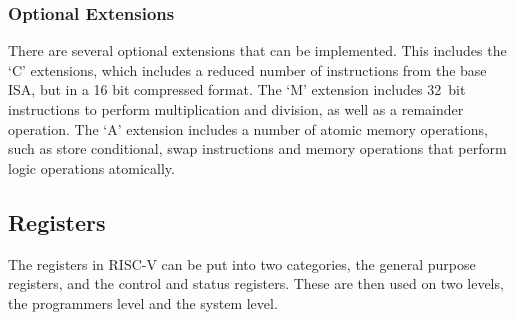 \subsubsection{Optional Extensions}
There are several optional extensions that can be implemented. This includes the `C' extensions, which includes a reduced number of instructions from the base ISA, but in a 16 bit compressed format. The `M' extension includes 32~bit instructions to perform multiplication and division, as well as a remainder operation. The `A' extension includes a number of atomic memory operations, such as store conditional, swap instructions and memory operations that perform logic operations atomically.
\subsection{Registers}
The registers in RISC-V can be put into two categories, the general purpose registers, and the control and status registers. These are then used on two levels, the programmers level and the system level.
